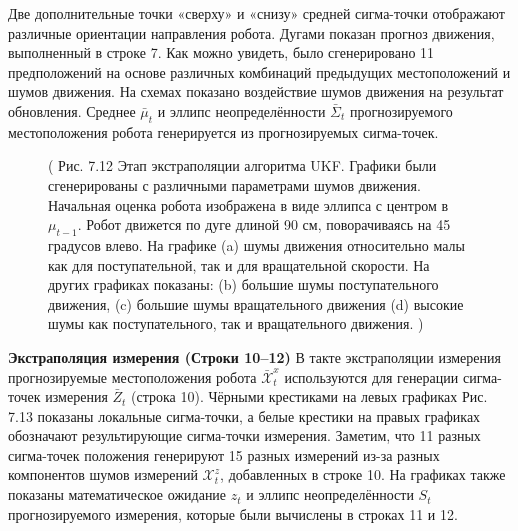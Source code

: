 \documentclass[10pt,a4paper]{article}
\begin{document}
Две дополнительные точки «сверху» и «снизу» средней сигма-точки отображают различные ориентации направления робота. Дугами показан прогноз движения, выполненный в строке 7. Как можно увидеть, было сгенерировано 11 предположений на основе различных комбинаций предыдущих местоположений и шумов движения. На схемах показано воздействие шумов движения на результат обновления. Среднее $\bar{\mu}_t$ и эллипс неопределённости $\bar{\varSigma}_t$ прогнозируемого местоположения робота генерируется из прогнозируемых сигма-точек.

\begin{figure}[H]
	\caption{ (  Рис. 7.12 Этап экстраполяции алгоритма UKF. Графики были сгенерированы с различными параметрами шумов движения. Начальная оценка робота изображена в виде эллипса с центром в $\mu_{t-1}$. Робот движется по дуге длиной 90 см, поворачиваясь на 45 градусов влево. На графике (a) шумы движения относительно малы как для поступательной, так и для вращательной скорости. На других графиках показаны: (b) большие шумы поступательного движения, (c) большие шумы вращательного движения (d) высокие шумы как поступательного, так и вращательного движения. )}
	\label{fig:712orig}
\end{figure}

\textbf{Экстраполяция измерения (Строки 10–12)} В такте экстраполяции измерения прогнозируемые местоположения робота $\bar{\mathcal{X}}_t^x$ используются для генерации сигма-точек измерения $\bar{Z}_t$ (строка 10). Чёрными крестиками на левых графиках Рис. 7.13 показаны локальные сигма-точки, а белые крестики на правых графиках обозначают результирующие сигма-точки измерения. Заметим, что 11 разных сигма-точек положения генерируют 15 разных измерений из-за разных компонентов шумов измерений $\mathcal{X}_t^z$, добавленных в строке 10.
На графиках также показаны математическое ожидание $\hat{z}_t$ и эллипс неопределённости $S_t$ прогнозируемого измерения, которые были вычислены в строках 11 и 12.
\end{document}
